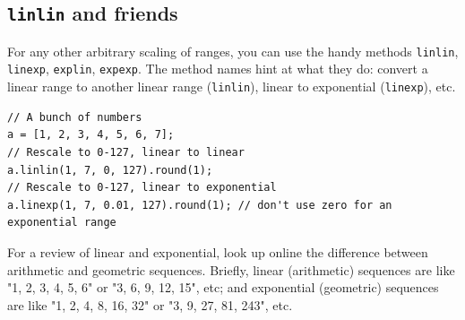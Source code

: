 \subsection{\texttt{linlin} and friends}

For any other arbitrary scaling of ranges, you can use the handy methods \texttt{linlin}, \texttt{linexp}, \texttt{explin}, \texttt{expexp}. The method names hint at what they do: convert a linear range to another linear range (\texttt{linlin}), linear to exponential (\texttt{linexp}), etc.

\begin{lstlisting}[style=SuperCollider-IDE, basicstyle=\scttfamily\footnotesize]
// A bunch of numbers
a = [1, 2, 3, 4, 5, 6, 7];
// Rescale to 0-127, linear to linear
a.linlin(1, 7, 0, 127).round(1);
// Rescale to 0-127, linear to exponential
a.linexp(1, 7, 0.01, 127).round(1); // don't use zero for an exponential range
\end{lstlisting}

For a review of linear and exponential, look up online the difference between arithmetic and geometric sequences. Briefly, linear (arithmetic) sequences are like "1, 2, 3, 4, 5, 6" or "3, 6, 9, 12, 15", etc; and exponential (geometric) sequences are like "1, 2, 4, 8, 16, 32" or "3, 9, 27, 81, 243", etc.

